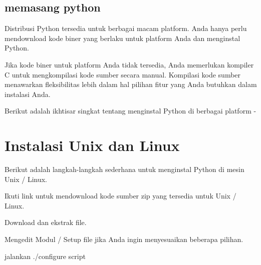 {\subsection{memasang python}
\noindent
{\fontsize{14pt}{14pt}\selectfont Distribusi Python tersedia untuk berbagai macam platform. Anda hanya perlu mendownload kode biner yang berlaku untuk platform Anda dan menginstal Python. \\} \par
\vspace{14pt}
\noindent
{\fontsize{14pt}{14pt}\selectfont Jika kode biner untuk platform Anda tidak tersedia, Anda memerlukan kompiler C untuk mengkompilasi kode sumber secara manual. Kompilasi kode sumber menawarkan fleksibilitas lebih dalam hal pilihan fitur yang Anda butuhkan dalam instalasi Anda. \\} \par
\vspace{14pt}
\noindent
{\fontsize{14pt}{14pt}\selectfont Berikut adalah ikhtisar singkat tentang menginstal Python di berbagai platform - \\} \par
\vspace{14pt}
\noindent
{\fontsize{14pt}{14pt}\section {Instalasi Unix dan Linux }
\noindent
{\fontsize{14pt}{14pt}\selectfont Berikut adalah langkah-langkah sederhana untuk menginstal Python di mesin Unix / Linux. \\} \par
\noindent
{\fontsize{14pt}{14pt}\selectfont Ikuti link untuk mendownload kode sumber zip yang tersedia untuk Unix / Linux. \\} \par
\vspace{14pt}
\noindent
{\fontsize{14pt}{14pt}\selectfont Download dan ekstrak file. \\} \par
\vspace{14pt}
\noindent
{\fontsize{14pt}{14pt}\selectfont Mengedit Modul / Setup file jika Anda ingin menyesuaikan beberapa pilihan. \\} \par
\vspace{14pt}
\noindent
{\fontsize{14pt}{14pt}\selectfont jalankan ./configure script \\} \par
\vspace{14pt}
}}

